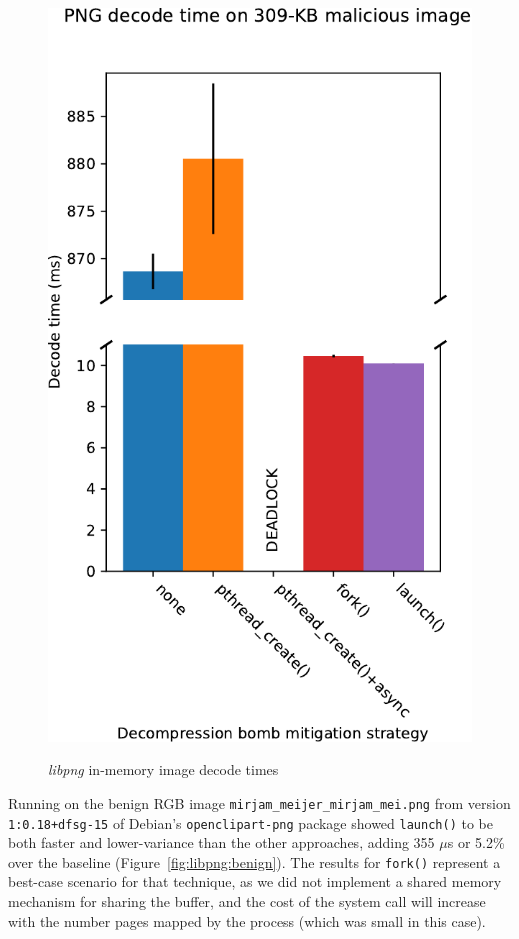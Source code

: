 \begin{figure}
\begin{minipage}{0.24\textwidth}
	\includegraphics[width=\textwidth]{figs/cerberus2_nns16_surplus256k_10K}
	\label{fig:libpng:bomb}
	\end{minipage}
\caption{\textit{libpng} in-memory image decode times}
\end{figure}

Running on the benign RGB image \texttt{mirjam\_meijer\_mirjam\_mei.png} from version
\texttt{1:0.18+dfsg-15} of Debian's \texttt{openclipart-png} package showed
\texttt{launch()} to be both faster and lower-variance than the other approaches,
adding 355 $\mu$s or 5.2\% over the baseline (Figure~\ref{fig:libpng:benign}).  The
results for \texttt{fork()} represent a best-case scenario for that technique, as we
did not implement a shared memory mechanism for sharing the buffer, and the cost of
the system call will increase with the number pages mapped by the process (which was
small in this case).

